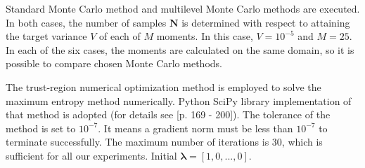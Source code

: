 \documentclass{article}
\def\vc#1{\mathbf{\boldsymbol{#1}}}     %
\def\vl{{\vc\lambda}}
\begin{document}
Standard Monte Carlo method and multilevel Monte Carlo methods are executed. In both cases, the number of samples $\vc N$ is determined with respect to attaining the target variance $V$ of each of $M$ moments. In this case, $V=10^{-5}$ and $M=25$. In each of the six cases, the moments are calculated on the same domain, so it is possible to compare chosen Monte Carlo methods.

The trust-region numerical optimization method is employed to solve the maximum entropy method numerically. %
Python SciPy library implementation of that method is adopted (for details see  \cite{Conn20000125}[p. 169 - 200]). The tolerance of the method is set to $10^{-7}$. It means a gradient norm must be less than $10^{-7}$ to terminate successfully. The maximum number of iterations is 30, which is sufficient for all our experiments. Initial $\vl = [1, 0, ..., 0]$. 









 
\end{document}
